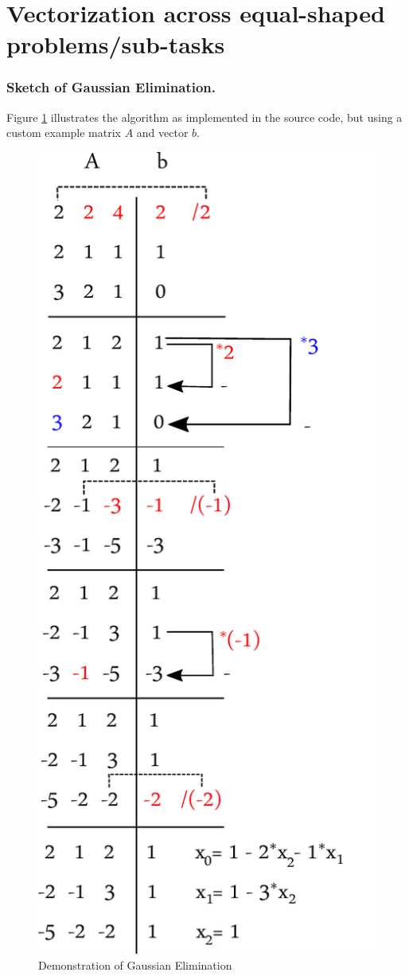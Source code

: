 \documentclass[11pt]{article}
\begin{document}
\section{Vectorization across equal-shaped problems/sub-tasks}
\subsubsection*{Sketch of Gaussian Elimination.}
Figure \ref{graph} illustrates the algorithm as implemented in the source code, but using a custom example matrix $A$ and vector $b$.

\begin{figure}[h]
  \begin{center}
    \includegraphics{../graphics/graph.pdf}
    \caption{Demonstration of Gaussian Elimination}
    \label{graph}
  \end{center}
\end{figure}
\end{document}
